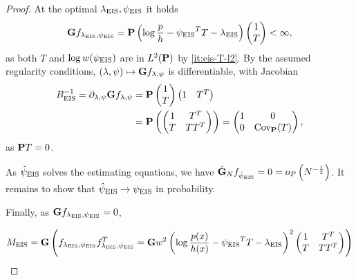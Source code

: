 \begin{proof}
    At the optimal $\lambda_{\eis}, \peis$ it holds
    \begin{align*}
    \G f_{\lambda_{\eis},\peis} = \P \left( \log \frac{p}{h} - \peis^{T}T - \lambda_{\eis}  \right) \begin{pmatrix}
        1 \\ T
    \end{pmatrix} < \infty,
    \end{align*}
    as both $T$ and $\log w(\peis)$ are in $L^{2}(\P)$ by \ref{it:eis-T-l2}.
    By the assumed regularity conditions, $(\lambda,\psi) \mapsto \G f_{\lambda, \psi}$ is differentiable, with Jacobian
    \begin{align*}
    B_{\eis}^{-1} = \partial_{\lambda,\psi}\G f_{\lambda,\psi} &= \P \begin{pmatrix}
        1 \\ T
    \end{pmatrix} \begin{pmatrix}
        1 & T^{T}
    \end{pmatrix}\\
        &= \P \left( \begin{pmatrix}
            1 & T^{T} \\
            T & TT^{T}
        \end{pmatrix} \right) = \begin{pmatrix}
            1 & 0 \\
            0 & \cov_{\P} (T)
        \end{pmatrix},
    \end{align*}
    as $\P T = 0$.

    As $\hpeis$ solves the estimating equations, we have $\hat\G_{N} f_{\hpeis} = 0 = o_{P} \left( N^{-\frac{1}{2}} \right)$. It remains to show that $\hpeis \to \peis$ in probability. 

    Finally, as $\G f_{\lambda_{\eis},\peis}=0$, 

    $$
    M_{\eis} = \G \left(f_{\lambda_{\eis},\peis} f_{\lambda_{\eis},\peis}^T = \G w^{2} \left( \log \frac{p(x)}{h(x)} - \peis^{T}T - \lambda_{\eis}\right)^{2} \begin{pmatrix}
        1 & T^{T} \\
        T & TT^{T}
    \end{pmatrix}\right)
    $$

    
\end{proof}

